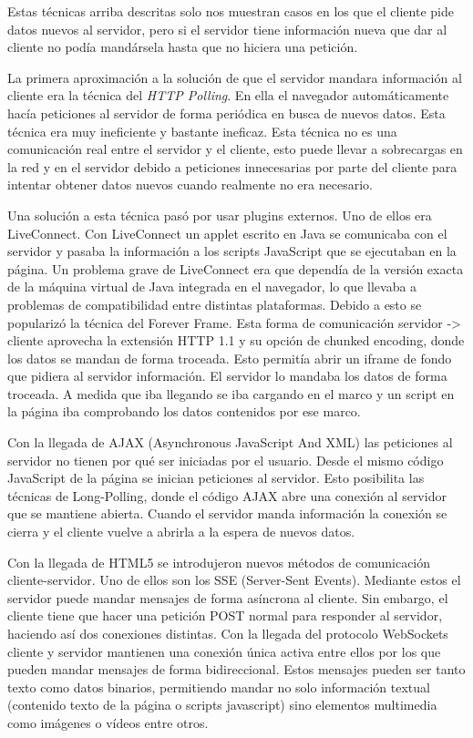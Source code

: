 \documentclass[12pt,a4paper]{article}
\begin{document}
Estas técnicas arriba descritas solo nos muestran casos en los que el cliente pide datos nuevos al servidor, pero si el servidor tiene información nueva que dar al cliente no podía mandársela hasta que no hiciera una petición.

La primera aproximación a la solución de que el servidor mandara información al cliente era la técnica del \emph{HTTP Polling}. En ella el navegador automáticamente hacía peticiones al servidor de forma periódica en busca de nuevos datos. Esta técnica era muy ineficiente y bastante ineficaz. Esta técnica no es una comunicación real entre el servidor y el cliente, esto puede llevar a sobrecargas en la red y en el servidor debido a peticiones innecesarias por parte del cliente para intentar obtener datos nuevos cuando realmente no era necesario. 

Una solución a esta técnica pasó por usar plugins externos. Uno de ellos era LiveConnect. Con LiveConnect un applet escrito en Java se comunicaba con el servidor y pasaba la información a los scripts JavaScript que se ejecutaban en la página. Un problema grave de LiveConnect era que dependía de la versión exacta de la máquina virtual de Java integrada en el navegador, lo que llevaba a problemas de compatibilidad entre distintas plataformas. Debido a esto se popularizó la técnica del Forever Frame. Esta forma de comunicación servidor -> cliente aprovecha la extensión HTTP 1.1 y su opción de chunked encoding, donde los datos se mandan de forma troceada. Esto permitía abrir un iframe de fondo que pidiera al servidor información. El servidor lo mandaba los datos de forma troceada. A medida que iba llegando se iba cargando en el marco y un script en la página iba comprobando los datos contenidos por ese marco.

Con la llegada de AJAX (Asynchronous JavaScript And XML) las peticiones al servidor no tienen por qué ser iniciadas por el usuario. Desde el mismo código JavaScript de la página se inician peticiones al servidor. Esto posibilita las técnicas de Long-Polling, donde el código AJAX abre una conexión al servidor que se mantiene abierta. Cuando el servidor manda información la conexión se cierra y el cliente vuelve a abrirla a la espera de nuevos datos.

Con la llegada de HTML5 se introdujeron nuevos métodos de comunicación cliente-servidor. Uno de ellos son los SSE (Server-Sent Events). Mediante estos el servidor puede mandar mensajes de forma asíncrona al cliente. Sin embargo, el cliente tiene que hacer una petición POST normal para responder al servidor, haciendo así dos conexiones distintas. Con la llegada del protocolo WebSockets cliente y servidor mantienen una conexión única activa entre ellos por los que pueden mandar mensajes de forma bidireccional. Estos mensajes pueden ser tanto texto como datos binarios, permitiendo mandar no solo información textual (contenido texto de la página o scripts javascript) sino elementos multimedia como imágenes o vídeos entre otros.
\end{document}
